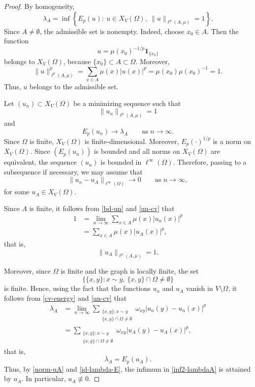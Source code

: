 \documentclass[twoside,12pt,letter]{article}
\theoremstyle{plain}
\theoremstyle{definition}
\theoremstyle{remark}
\numberwithin{equation}{section}
\begin{document}
\begin{proof}
By homogeneity,
\begin{equation}\label{inf2-lambdaA}
\lambda_A
=
\inf
\left\{
E_p(u):\
u\in X_V(\Omega),\
\|u\|_{\ell^p(A,\mu)}=1
\right\}.
\end{equation}
Since \(A\neq\emptyset\), the admissible set is nonempty. Indeed, choose
\(x_0\in A\). Then the function
\[
u=\mu(x_0)^{-1/p}\mathbf{1}_{\{x_0\}}
\]
belongs to \(X_V(\Omega)\), because \(\{x_0\}\subset A\subset\Omega\).
Moreover,
\[
\|u\|_{\ell^p(A,\mu)}^p
=
\sum_{x\in A}\mu(x)|u(x)|^p
=
\mu(x_0)\mu(x_0)^{-1}
=
1.
\]
Thus, \(u\) belongs to the admissible set.

Let \((u_n)\subset X_V(\Omega)\) be a minimizing sequence such that
\begin{equation}\label{bd-un}
\|u_n\|_{\ell^p(A,\mu)}=1
\end{equation}
and
\begin{equation}\label{cv-energy}
E_p(u_n)\to \lambda_A
\qquad \text{as } n\to\infty.
\end{equation}
Since \(\Omega\) is finite, \(X_V(\Omega)\) is finite-dimensional. Moreover,
\(E_p(\cdot)^{1/p}\) is a norm on \(X_V(\Omega)\). Since \((E_p(u_n))\) is
bounded and all norms on \(X_V(\Omega)\) are equivalent, the sequence
\((u_n)\) is bounded in \(\ell^\infty(\Omega)\). Therefore, passing to a
subsequence if necessary, we may assume that
\begin{equation}\label{un-cv}
\|u_n-u_A\|_{\ell^\infty(\Omega)}\to 0
\qquad \text{as } n\to\infty,
\end{equation}
for some \(u_A\in X_V(\Omega)\).

Since \(A\) is finite, it follows from \eqref{bd-un} and \eqref{un-cv} that
\[
\begin{aligned}
1
&=
\lim_{n\to\infty}\sum_{x\in A}\mu(x)|u_n(x)|^p\\
&=
\sum_{x\in A}\mu(x)|u_A(x)|^p,
\end{aligned}
\]
that is,
\begin{equation}\label{norm-uA}
\|u_A\|_{\ell^p(A,\mu)}=1.
\end{equation}

Moreover, since \(\Omega\) is finite and the graph is locally finite, the set
\[
\bigl\{\{x,y\}:x\sim y,\ \{x,y\}\cap\Omega\neq\emptyset\bigr\}
\]
is finite. Hence, using the fact that the functions \(u_n\) and \(u_A\) vanish
in \(V\setminus\Omega\), it follows from \eqref{cv-energy} and \eqref{un-cv}
that
\[
\begin{aligned}
\lambda_A
&=
\lim_{n\to\infty}
\sum_{\substack{\{x,y\}:x\sim y\\ \{x,y\}\cap\Omega\neq\emptyset}}
\omega_{xy}|u_n(y)-u_n(x)|^p \\
&=
\sum_{\substack{\{x,y\}:x\sim y\\ \{x,y\}\cap\Omega\neq\emptyset}}
\omega_{xy}|u_A(y)-u_A(x)|^p,
\end{aligned}
\]
that is,
\begin{equation}\label{id-lambda-E}
\lambda_A=E_p(u_A).
\end{equation}
Thus, by \eqref{norm-uA} and \eqref{id-lambda-E}, the infimum in
\eqref{inf2-lambdaA} is attained by \(u_A\). In particular,
\(u_A\not\equiv 0\).


\end{proof}
\end{document}
